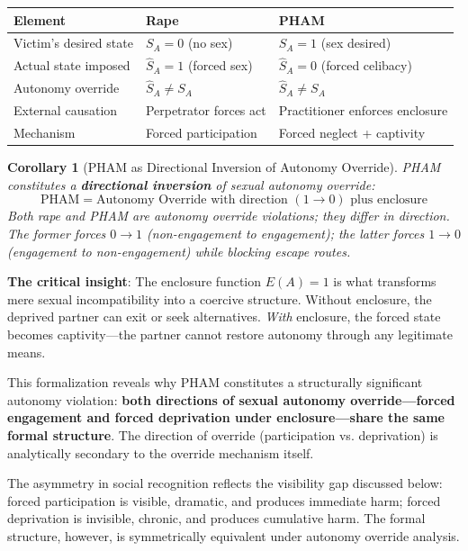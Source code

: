 \documentclass[12pt,openany]{book}
\newtheorem{corollary}{Corollary}[chapter]
\numberwithin{equation}{chapter}
\begin{document}
\begin{center}
\begin{tabular}{|p{1.8in}|p{2.2in}|p{2.2in}|}
\hline
\textbf{Element} & \textbf{Rape} & \textbf{PHAM} \\
\hline
Victim's desired state & $S_A = 0$ (no sex) & $S_A = 1$ (sex desired) \\
\hline
Actual state imposed & $\hat{S}_A = 1$ (forced sex) & $\hat{S}_A = 0$ (forced celibacy) \\
\hline
Autonomy override & $\hat{S}_A \neq S_A$ & $\hat{S}_A \neq S_A$ \\
\hline
External causation & Perpetrator forces act & Practitioner enforces enclosure \\
\hline
Mechanism & Forced participation & Forced neglect + captivity \\
\hline
\end{tabular}
\end{center}

\begin{corollary}[PHAM as Directional Inversion of Autonomy Override]
PHAM constitutes a \textbf{directional inversion} of sexual autonomy override:
\[
\text{PHAM} = \text{Autonomy Override with direction } (1 \rightarrow 0) \text{ plus enclosure}
\]
Both rape and PHAM are autonomy override violations; they differ in direction. The former forces $0 \rightarrow 1$ (non-engagement to engagement); the latter forces $1 \rightarrow 0$ (engagement to non-engagement) while blocking escape routes.
\end{corollary}

\textbf{The critical insight}: The enclosure function $E(A) = 1$ is what transforms mere sexual incompatibility into a coercive structure. Without enclosure, the deprived partner can exit or seek alternatives. \textit{With} enclosure, the forced state becomes captivity---the partner cannot restore autonomy through any legitimate means.

This formalization reveals why PHAM constitutes a structurally significant autonomy violation: \textbf{both directions of sexual autonomy override---forced engagement and forced deprivation under enclosure---share the same formal structure}. The direction of override (participation vs. deprivation) is analytically secondary to the override mechanism itself.

The asymmetry in social recognition reflects the visibility gap discussed below: forced participation is visible, dramatic, and produces immediate harm; forced deprivation is invisible, chronic, and produces cumulative harm. The formal structure, however, is symmetrically equivalent under autonomy override analysis.
\end{document}
